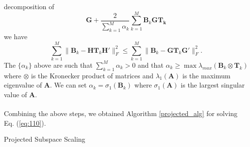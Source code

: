 decomposition of
\begin{equation}
  \label{eq:113}
  \mathbf{G} + \frac{2}{\sum_{k=1}^{M} \alpha_k} \sum_{k=1}^{M}
  \mathbf{B}_k \mathbf{G} \mathbf{T_k}
\end{equation}
we have
\begin{equation}
  \label{eq:114}
  \sum_{k=1}^{M} \| \mathbf{B}_k - \mathbf{H}
\mathbf{T}_k \mathbf{H}' \|_F^2 \leq \sum_{k=1}^{M} \|
\mathbf{B}_k - \mathbf{G}
\mathbf{T}_k \mathbf{G}' \|_F^2. 
\end{equation}
The $\{\alpha_k\}$ above are such that $\sum_{k=1}^{M}{\alpha_k} > 0$
and that $\alpha_k \geq \max{
  \lambda_{max}(\mathbf{B}_k \otimes \mathbf{T}_k)
}$ where $\otimes$ is the Kronecker product of matrices and
$\lambda_{1}(\mathbf{A})$ is the maximum eigenvalue of
$\mathbf{A}$. We can set $\alpha_k = \sigma_1(\mathbf{B}_k)$
where $\sigma_1(\mathbf{A})$ is the largest singular value of
$\mathbf{A}$. \\ \\
\noindent
Combining the above steps, we obtained Algorithm \ref{projected_alg} for
solving Eq. (\ref{eq:110}). 
\begin{algorithm}
  \dontprintsemicolon
   \caption{Projected Subspace Scaling}
   \label{projected_alg}
 \end{algorithm}
